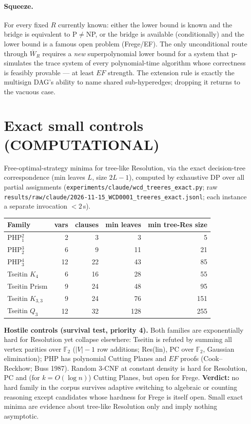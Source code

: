 \documentclass[11pt]{article}
\begin{document}
\paragraph{Squeeze.} For every fixed $R$ currently known: either the lower bound
is known and the bridge is equivalent to P$\ne$NP, or the bridge is available
(conditionally) and the lower bound is a famous open problem (Frege/EF).
The only unconditional route through $\overline W_R$ requires a \emph{new}
superpolynomial lower bound for a system that p-simulates the trace system of
every polynomial-time algorithm whose correctness is feasibly provable --- at
least $EF$ strength. The extension rule is exactly the multisign DAG's
ability to name shared sub-hyperedges; dropping it returns to the vacuous case.

\section{Exact small controls (COMPUTATIONAL)}
Free-optimal-strategy minima for tree-like Resolution, via the exact
decision-tree correspondence (min leaves $L$, size $2L-1$), computed by exhaustive
DP over all partial assignments (\texttt{experiments/claude/wcd\_treeres\_exact.py};
raw \texttt{results/raw/claude/2026-11-15\_WCD0001\_treeres\_exact.jsonl};
each instance a separate invocation $<2$\,s).
\begin{center}\begin{tabular}{lrrrr}\toprule
Family & vars & clauses & min leaves & min tree-Res size\\\midrule
PHP$^2_1$ & 2 & 3 & 3 & 5\\
PHP$^3_2$ & 6 & 9 & 11 & 21\\
PHP$^4_3$ & 12 & 22 & 43 & 85\\
Tseitin $K_4$ & 6 & 16 & 28 & 55\\
Tseitin Prism & 9 & 24 & 48 & 95\\
Tseitin $K_{3,3}$ & 9 & 24 & 76 & 151\\
Tseitin $Q_3$ & 12 & 32 & 128 & 255\\\bottomrule\end{tabular}\end{center}
\textbf{Hostile controls (survival test, priority 4).} Both families are
exponentially hard for Resolution yet collapse elsewhere: Tseitin is refuted by
summing all vertex parities over $\mathbb F_2$ ($|V|-1$ row additions; Res(lin),
PC over $\mathbb F_2$, Gaussian elimination); PHP has polynomial Cutting Planes
and $EF$ proofs (Cook--Reckhow; Buss 1987). Random 3-CNF at constant density is
hard for Resolution, PC and (for $k=O(\log n)$) Cutting Planes, but open for
Frege. \textbf{Verdict:} no hard family in the corpus survives adaptive switching
to algebraic or counting reasoning except candidates whose hardness for Frege is
itself open. Small exact minima are evidence about tree-like Resolution only and
imply nothing asymptotic.
\end{document}
